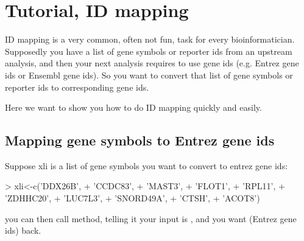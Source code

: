 \documentclass[12pt]{article}
\begin{document}
   
\section{Tutorial, ID mapping}


ID mapping is a very common, often not fun, task for every bioinformatician. Supposedly you have a list of gene symbols or reporter ids from an upstream analysis, and then your next analysis requires to use gene ids (e.g. Entrez gene ids or Ensembl gene ids). So you want to convert that list of gene symbols or reporter ids to corresponding gene ids.

Here we want to show you how to do ID mapping quickly and easily. 

\subsection{Mapping gene symbols to Entrez gene ids}

Suppose xli is a list of gene symbols you want to convert to entrez gene ids:

\begin{Schunk}
\begin{Sinput}
> xli<-c('DDX26B',
+  'CCDC83',
+  'MAST3',
+  'FLOT1',
+  'RPL11',
+  'ZDHHC20',
+  'LUC7L3',
+  'SNORD49A',
+  'CTSH',
+  'ACOT8')
\end{Sinput}
\end{Schunk}

you can then call  method, telling it your input is , and you want  (Entrez gene ids) back.
\end{document}
